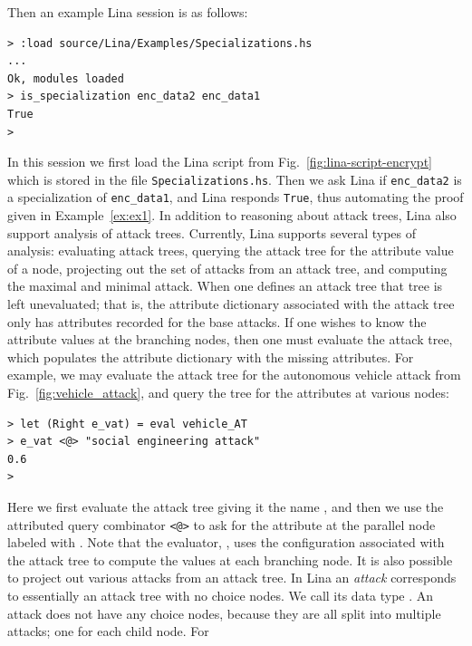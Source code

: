 \documentclass{llncs}
\begin{document}
Then an example Lina session is as follows:
\begin{mdframed}\scriptsize
  \begin{verbatim}
> :load source/Lina/Examples/Specializations.hs
...
Ok, modules loaded
> is_specialization enc_data2 enc_data1
True
>     
  \end{verbatim}
\end{mdframed}
In this session we first load the Lina script from
Fig.~\ref{fig:lina-script-encrypt} which is stored in the file
\verb!Specializations.hs!.  Then we ask Lina if \verb!enc_data2! is a
specialization of \verb!enc_data1!, and Lina responds \verb!True!,
thus automating the proof given in Example~\ref{ex:ex1}.
In addition to reasoning about attack trees, Lina also support
analysis of attack trees.  Currently, Lina supports several types of
analysis: evaluating attack trees, querying the attack tree for the
attribute value of a node, projecting out the set of attacks from an
attack tree, and computing the maximal and minimal attack.
When one defines an attack tree that tree is left unevaluated; that
is, the attribute dictionary associated with the attack tree only has
attributes recorded for the base attacks.  If one wishes to know the
attribute values at the branching nodes, then one must evaluate the
attack tree, which populates the attribute dictionary with the missing
attributes.  For example, we may evaluate the attack tree for the
autonomous vehicle attack from Fig.~\ref{fig:vehicle_attack}, and
query the tree for the attributes at various nodes:
\begin{mdframed}
\scriptsize
\begin{verbatim}
> let (Right e_vat) = eval vehicle_AT
> e_vat <@> "social engineering attack"
0.6
> 
\end{verbatim}  
\end{mdframed}
Here we first evaluate the attack tree  giving it the
name , and then we use the attributed query combinator
\verb!<@>! to ask for the attribute at the parallel node labeled with
. Note that the evaluator, ,
uses the configuration associated with the attack tree to compute the
values at each branching node.
It is also possible to project out various attacks from an attack
tree.  In Lina an \emph{attack} corresponds to essentially an attack
tree with no choice nodes.  We call its data type .  An attack does not have any choice nodes, because they are
all split into multiple attacks; one for each child node.  For
\end{document}
